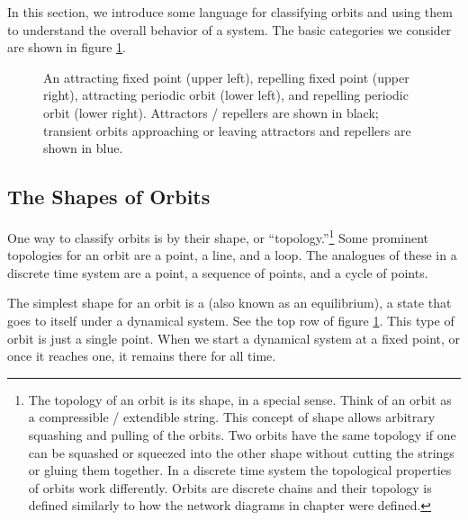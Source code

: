 In this section, we  introduce some language for classifying orbits and using them to understand the overall behavior of a system. The basic categories we consider are shown in figure \ref{F:attractorsRepellers}.

\begin{figure}[h]
\centering
{}
\caption[Pamela Payne.]{An attracting fixed point (upper left), repelling fixed point (upper right), attracting periodic orbit (lower left), and repelling periodic orbit (lower right). Attractors / repellers are shown in black; transient orbits approaching or leaving attractors and repellers are shown in blue.}
\label{F:attractorsRepellers}
\end{figure}

\subsection{The Shapes of Orbits}

One way to classify orbits is by their shape, or ``topology.''\footnote{The topology of an orbit is its shape, in a special sense. Think of an orbit as a compressible / extendible string. This concept of shape allows arbitrary squashing and pulling of the orbits. Two orbits have the same topology if one can be squashed or squeezed into the other shape without cutting the strings or gluing them together. In a discrete time system the topological properties of orbits work differently. Orbits are discrete chains and their topology is defined similarly to how the network diagrams in chapter  were defined.} Some prominent topologies for an orbit are a point, a line, and a loop. The analogues of these in a discrete time system are a point, a sequence of points, and a cycle of points.

   The simplest shape for an orbit is a  (also known as
an equilibrium), a state that goes to itself under a dynamical system. See the
top row of figure \ref{F:attractorsRepellers}.  This type of orbit is just a
single point.  When we start a dynamical system at a fixed point, or once it reaches one, it
remains there for all time.

